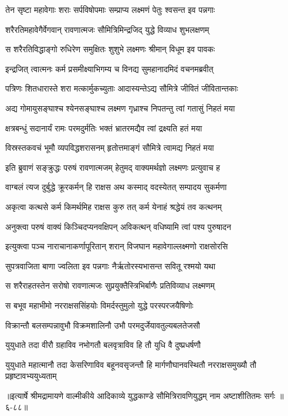 \twolineshloka
{तेन सृष्टा महावेगाः शराः सर्पविषोपमाः}
{सम्प्राप्य लक्ष्मणं पेतुः श्वसन्त इव पन्नगाः} %

\twolineshloka
{शरैरतिमहावेगैर्वेगवान् रावणात्मजः}
{सौमित्रिमिन्द्रजिद् युद्धे विव्याध शुभलक्षणम्} %

\twolineshloka
{स शरैरतिविद्धाङ्गो रुधिरेण समुक्षितः}
{शुशुभे लक्ष्मणः श्रीमान् विधूम इव पावकः} %

\twolineshloka
{इन्द्रजित् त्वात्मनः कर्म प्रसमीक्ष्याभिगम्य च}
{विनद्य सुमहानादमिदं वचनमब्रवीत्} %

\twolineshloka
{पत्रिणः शितधारास्ते शरा मत्कार्मुकच्युताः}
{आदास्यन्तेऽद्य सौमित्रे जीवितं जीवितान्तकाः} %

\twolineshloka
{अद्य गोमायुसङ्घाश्च श्येनसङ्घाश्च लक्ष्मण}
{गृध्राश्च निपतन्तु त्वां गतासुं निहतं मया} %

\twolineshloka
{क्षत्रबन्धुं सदानार्यं रामः परमदुर्मतिः}
{भक्तं भ्रातरमद्यैव त्वां द्रक्ष्यति हतं मया} %

\twolineshloka
{विस्रस्तकवचं भूमौ व्यपविद्धशरासनम्}
{हृतोत्तमाङ्गं सौमित्रे त्वामद्य निहतं मया} %

\twolineshloka
{इति ब्रुवाणं सङ्क्रुद्धः परुषं रावणात्मजम्}
{हेतुमद् वाक्यमर्थज्ञो लक्ष्मणः प्रत्युवाच ह} %

\twolineshloka
{वाग्बलं त्यज दुर्बुद्धे क्रूरकर्मन् हि राक्षस}
{अथ कस्माद् वदस्येतत् सम्पादय सुकर्मणा} %

\twolineshloka
{अकृत्वा कत्थसे कर्म किमर्थमिह राक्षस}
{कुरु तत् कर्म येनाहं श्रद्धेयं तव कत्थनम्} %

\twolineshloka
{अनुक्त्वा परुषं वाक्यं किञ्चिदप्यनवक्षिपन्}
{अविकत्थन् वधिष्यामि त्वां पश्य पुरुषादन} %

\twolineshloka
{इत्युक्त्वा पञ्च नाराचानाकर्णापूरितान् शरान्}
{विजघान महावेगाल्लक्ष्मणो राक्षसोरसि} %

\twolineshloka
{सुपत्रवाजिता बाणा ज्वलिता इव पन्नगाः}
{नैर्ऋतोरस्यभासन्त सवितू रश्मयो यथा} %

\twolineshloka
{स शरैराहतस्तेन सरोषो रावणात्मजः}
{सुप्रयुक्तैस्त्रिभिर्बाणैः प्रतिविव्याध लक्ष्मणम्} %

\twolineshloka
{स बभूव महाभीमो नरराक्षससिंहयोः}
{विमर्दस्तुमुलो युद्धे परस्परजयैषिणोः} %

\twolineshloka
{विक्रान्तौ बलसम्पन्नावुभौ विक्रमशालिनौ}
{उभौ परमदुर्जेयावतुल्यबलतेजसौ} %

\twolineshloka
{युयुधाते तदा वीरौ ग्रहाविव नभोगतौ}
{बलवृत्राविव हि तौ युधि वै दुष्प्रधर्षणौ} %

\threelineshloka
{युयुधाते महात्मानौ तदा केसरिणाविव}
{बहूनवसृजन्तौ हि मार्गणौघानवस्थितौ}
{नरराक्षसमुख्यौ तौ प्रहृष्टावभ्ययुध्यताम्} %


॥इत्यार्षे श्रीमद्रामायणे वाल्मीकीये आदिकाव्ये युद्धकाण्डे सौमित्रिरावणियुद्धम् नाम अष्टाशीतितमः सर्गः ॥६-८८॥

